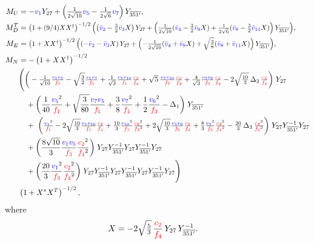 \documentclass[a4paper,12pt]{article}
\def\yd{Y_{27}}
\def\yt{Y_{\overline{351'}}}
\def\yz{\yd\yt^{-1}\yd}
\def\RED{\textcolor{red}}
\def\BLUE{\textcolor{blue}}
\begin{document}
\begin{align}
M_U&=-\BLUE{v_1} \yd+\left(\tfrac{1}{2\sqrt{10}} \BLUE{v_5}-\tfrac{1}{2\sqrt{6}} \BLUE{v_7}\right)\yt,\label{equation:low-energy-masses-first}\\
M_D^T&=\scalebox{0.9}{$ \left(1+(9/4)XX^\dagger\right)^{-1/2} \left(\left(\BLUE{\bar{v}_2}-\tfrac{3}{2}\BLUE{\bar{v}_3}X
\right)\yd+\left(\tfrac{1}{2\sqrt{10}}(\BLUE{\bar{v}_4}-\tfrac{3}{2}\BLUE{\bar{v}_9}X)+\tfrac{1}{2\sqrt{6}}(\BLUE{\bar{v}_8}-\tfrac{3}{2}\BLUE{\bar{v}_{11}}X)\right)\yt\right) $},\\
M_E&=\scalebox{0.9}{$ \left(1+XX^\dagger\right)^{-1/2} \left(\left(-\BLUE{\bar{v}_2}-\BLUE{\bar{v}_3}X
\right)\yd+\left(-\tfrac{1}{2\sqrt{10}}(\BLUE{\bar{v}_4}+\BLUE{\bar{v}_9}X)+\sqrt{\tfrac{3}{8}}(\BLUE{\bar{v}_8}+\BLUE{\bar{v}_{11}}X)\right)\yt\right) $},\label{equation:low-energy-masses-third}\\
M_N&=-\left(1+XX^\dagger\right)^{-1/2}\nonumber\\
    &\Bigg(\scalebox{0.95}{$ \bigg(-\frac{1}{\sqrt{10}}\frac{\BLUE{v_1} \BLUE{v_5}}{\RED{f_1}}-\sqrt{\frac{3}{2}}\frac{\BLUE{v_1} \BLUE{v_7}}{\RED{f_1}}+
    \frac{1}{\sqrt{3}}\frac{\BLUE{v_5} \BLUE{v_{10}}}{\RED{f_1}}\frac{\RED{c_2}}{\RED{f_4}}+\sqrt{5}\,\frac{\BLUE{v_7} \BLUE{v_{10}}}{\RED{f_1}}\frac{\RED{c_2}}{\RED{f_4}}+
    \frac{4}{\sqrt{3}}\frac{\BLUE{v_5} \BLUE{v_6}}{\RED{f_3}}\frac{\RED{c_2}}{\RED{f_4}}-2\sqrt{\frac{10}{3}}\,\Delta_2\,\frac{\RED{c_2}}{\RED{f_4}}\bigg) $}\;\yd\nonumber\\
    &\quad +\bigg(\frac{1}{40}\frac{\BLUE{v_5}^2}{\RED{f_1}}+\sqrt{\frac{3}{80}}\frac{\BLUE{v_7} \BLUE{v_5}}{\RED{f_1}}+\frac{3}{8}\frac{\BLUE{v_7}^2}{\RED{f_1}}+ \frac{1}{2}\frac{\BLUE{v_6}^2}{\RED{f_3}}-\Delta_1\bigg)\;\yt\nonumber\\
    &\quad + \scalebox{0.95}{ $\bigg(\frac{\BLUE{v_1}^2}{\RED{f_1}}-2 \sqrt{\frac{10}{3}} \frac{\BLUE{v_1} \BLUE{v_{10}}}{\RED{f_1}}\frac{\RED{c_2}}{\RED{f_4}}
    +\frac{10}{3}\frac{\BLUE{v_{10}}^2}{\RED{f_1}}\frac{\RED{c_2}^2}{\RED{f_4}^2}
    +2 \sqrt{\frac{10}{3}}\frac{\BLUE{v_1} \BLUE{v_6}}{\RED{f_3}}\frac{\RED{c_2}}{\RED{f_4}}
    +\frac{8}{3}\frac{\BLUE{v_5}^2}{\RED{f_3}}\frac{\RED{c_2}^2}{\RED{f_4}^2}-\frac{20}{3}\,\Delta_3\,\frac{\RED{c_2}^2}{\RED{f_4}^2}\bigg) $}\;\yz\nonumber\\
    &\quad +\bigg(\frac{8\sqrt{10}}{3}\frac{\BLUE{v_1} \BLUE{v_5}}{\RED{f_3}}\frac{\RED{c_2}^2}{\RED{f_4}^2}\bigg)\;\yd\yt^{-1}\yd\yt^{-1}\yd\nonumber\\
    &\quad +\bigg(\frac{20}{3}\frac{\BLUE{v_1}^2}{\RED{f_3}}\frac{\RED{c_2}^2}{\RED{f_4}^2}\bigg)\;\yd\yt^{-1}\yd\yt^{-1}\yd\yt^{-1}\yd\Bigg)\nonumber\\
    &\left(1+X^\ast X^T\right)^{-1/2}\label{equation:low-energy-masses-last},
\end{align}
where
\begin{align}
X&=-2\sqrt{\tfrac{5}{3}}\,\frac{\RED{c_2}}{\RED{f_4}}\,\yd\,\yt^{-1}.\label{equation:X0-definition}
\end{align}
\end{document}
